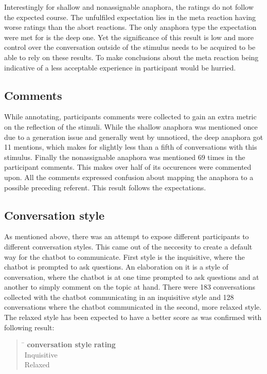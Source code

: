 Interestingly for shallow and nonassignable anaphora,
the ratings do not follow the expected course.
The unfulfiled expectation lies in the meta reaction having worse ratings than the abort reactions.
The only anaphora type the expectation were met for is the deep one.
Yet the significance of this result is low and
more control over the conversation outside of the stimulus needs to be acquired
to be able to rely on these results.
To make conclusions about the meta reaction being indicative of
a less acceptable experience in participant
would be hurried.

\subsection{Comments}

While annotating, participants comments were collected
to gain an extra metric on the reflection of the stimuli.
While the shallow anaphora was mentioned once due to a generation issue
and generally went by unnoticed,
the deep anaphora got 11 mentions, which makes for
slightly less than a fifth of conversations with this stimulus.
Finally the nonassignable anaphora was mentioned 69 times in the participant comments.
This makes over half of its occurences were commented upon.
All the comments expressed confusion about mapping the anaphora to a possible preceding referent.
This result follows the expectations.

\subsection{Conversation style}

As mentioned above, there was an attempt
to expose different participants to different conversation styles.
This came out of the neccesity to create a default way for the chatbot to communicate.
First style is the inquisitive, where the chatbot is prompted to ask questions.
An elaboration on it is a style of conversation,
where the chatbot is at one time prompted to ask questions and
at another to simply comment on the topic at hand.
There were 183 conversations collected with the chatbot communicating in an inquisitive style
and 128 conversations where the chatbot communicated in the second, more relaxed style.
The relaxed style has been expected to have a better score as was confirmed
with following result:

\begin{quote}
\begin{tabbing}
\hspace{4cm} \= \hspace{3cm} \kill %
\textbf{conversation style} \> \textbf{rating} \\
Inquisitive \\
Relaxed  \\
\end{tabbing}
\end{quote}

